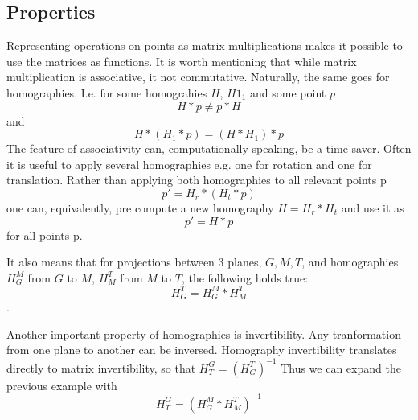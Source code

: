 \subsection{Properties}
Representing operations on points as matrix multiplications makes it possible
to use the matrices as functions. It is worth mentioning that while matrix
multiplication is associative, it not commutative. Naturally, the same goes for
homographies. I.e. for some homograhies $H$, $H1_{1}$ and some point $p$ $$H*p
\ne p*H$$ and $$H*(H_{1}*p) = (H*H_{1})*p$$ The feature of associativity can,
computationally speaking, be a time saver. Often it is useful to apply several
homographies e.g. one for rotation and one for translation. Rather than
applying both homographies to all relevant points p $$p' = H_{r} * (H_{t} * p)$$ one
can, equivalently, pre compute a new homography $H=H_{r}*H_{t}$ and use it as
$$p' = H * p$$ for all points p.

It also means that for projections between 3 planes, $G, M, T$, and
homographies $H_{G}^{M}$ from $G$ to $M$, $H_{M}^{T}$ from $M$ to $T$, the
following holds true: $$H_{G}^{T} = H_{G}^{M} * H_{M}^{T}$$.

Another important property of homographies is invertibility. Any tranformation
from one plane to another can be inversed. Homography invertibility translates
directly to matrix invertibility, so that $H_{T}^{G} = (H_{G}^{T})^{-1}$
Thus we can expand the previous example with
$$H_{T}^{G} = (H_{G}^{M} * H_{M}^{T})^{-1}$$
